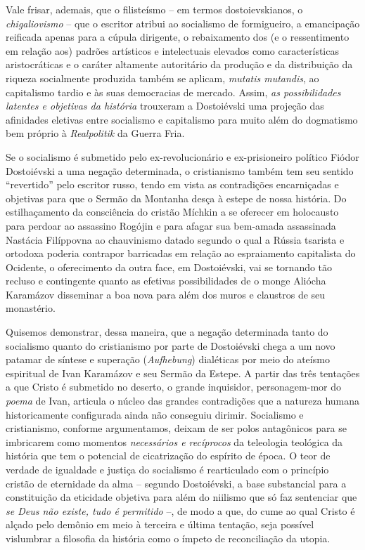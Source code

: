 Vale frisar, ademais, que o filisteísmo -- em termos dostoievskianos, o
\emph{chigaliovismo} -- que o escritor atribui ao socialismo de
formigueiro, a emancipação reificada apenas para a cúpula dirigente, o
rebaixamento dos (e o ressentimento em relação aos) padrões artísticos e
intelectuais elevados como características aristocráticas e o caráter
altamente autoritário da produção e da distribuição da riqueza
socialmente produzida também se aplicam, \emph{mutatis mutandis}, ao
capitalismo tardio e às suas democracias de mercado. Assim, \emph{as
possibilidades latentes e objetivas da história} trouxeram a Dostoiévski
uma projeção das afinidades eletivas entre socialismo e capitalismo para
muito além do dogmatismo bem próprio à \emph{Realpolitik} da Guerra
Fria.

Se o socialismo é submetido pelo ex-revolucionário e ex-prisioneiro
político Fiódor Dostoiévski a uma negação determinada, o cristianismo
também tem seu sentido ``revertido'' pelo escritor russo, tendo em vista
as contradições encarniçadas e objetivas para que o Sermão da Montanha
desça à estepe de nossa história. Do estilhaçamento da consciência do
cristão Míchkin a se oferecer em holocausto para perdoar ao assassino
Rogójin e para afagar sua bem-amada assassinada Nastácia Filíppovna ao
chauvinismo datado segundo o qual a Rússia tsarista e ortodoxa poderia
contrapor barricadas em relação ao espraiamento capitalista do Ocidente,
o oferecimento da outra face, em Dostoiévski, vai se tornando tão
recluso e contingente quanto as efetivas possibilidades de o monge
Aliócha Karamázov disseminar a boa nova para além dos muros e claustros
de seu monastério.

Quisemos demonstrar, dessa maneira, que a negação determinada tanto do
socialismo quanto do cristianismo por parte de Dostoiévski chega a um
novo patamar de síntese e superação (\emph{Aufhebung}) dialéticas por
meio do ateísmo espiritual de Ivan Karamázov e seu Sermão da Estepe. A
partir das três tentações a que Cristo é submetido no deserto, o grande
inquisidor, personagem-mor do \emph{poema} de Ivan, articula o núcleo
das grandes contradições que a natureza humana historicamente
configurada ainda não conseguiu dirimir. Socialismo e cristianismo,
conforme argumentamos, deixam de ser polos antagônicos para se
imbricarem como momentos \emph{necessários e recíprocos} da teleologia
teológica da história que tem o potencial de cicatrização do espírito de
época. O teor de verdade de igualdade e justiça do socialismo é
rearticulado com o princípio cristão de eternidade da alma -- segundo
Dostoiévski, a base substancial para a constituição da eticidade
objetiva para além do niilismo que só faz sentenciar que \emph{se Deus
não existe, tudo é permitido} --, de modo a que, do cume ao qual Cristo
é alçado pelo demônio em meio à terceira e última tentação, seja
possível vislumbrar a filosofia da história como o ímpeto de
reconciliação da utopia.

